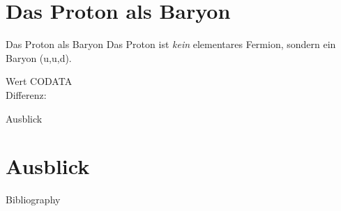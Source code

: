 \documentclass[t,9pt]{beamer}
\begin{document}
        \section{Das Proton als Baryon}
        \begin{frame}{Das Proton als Baryon}
                \pause
                Das Proton ist \textit{kein} elementares Fermion, sondern ein Baryon (u,u,d).
                \pause
                \begin{center}
                \end{center}
                Wert CODATA\cite{CODATA_proton_magneton}
                \pause
                \\ Differenz: 
                \begin{center}
                \end{center}
        \end{frame}

        \begin{frame}{Ausblick}
                \section{Ausblick}
                
        \end{frame}

        \begin{frame}{Bibliography}
                \tiny
                
                
        \end{frame}
                
\end{document}

